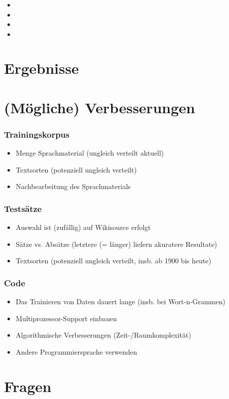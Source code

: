 \documentclass[t]{beamer} %
\begin{document}
% 
\begin{frame}
  \frametitle{}
  \begin{itemize}
  \item \pause
  \vspace*{1ex}
  \item  \pause
  \item \pause
  \item 
  \vspace*{1ex}
  \end{itemize}  
\end{frame}

\section{Ergebnisse}

\section{(Mögliche) Verbesserungen}
% 
\begin{frame}
  \frametitle{Trainingskorpus}
  \begin{itemize}
  \item Menge Sprachmaterial (ungleich verteilt aktuell)\pause
  \item Textsorten (potenziell ungleich verteilt)\pause
  \item Nachbearbeitung des Sprachmaterials\pause
  \end{itemize}  
\end{frame}

\begin{frame}
  \frametitle{Testsätze}
  \begin{itemize}
  \item Auswahl ist (zufällig) auf Wikisource erfolgt\pause
  \vspace*{1ex}
  \item Sätze vs. Absätze (letztere (= länger) liefern akuratere Resultate)\pause
  \item Textsorten (potenziell ungleich verteilt, insb. ab 1900 bis heute)\pause
  \end{itemize}  
\end{frame}


\begin{frame}
  \frametitle{Code}
  \begin{itemize}
  \item Das Trainieren von Daten dauert lange (insb. bei Wort-n-Grammen)\pause
  \vspace*{1ex}
  \item Multiprozessor-Support einbauen\pause
  \item Algorithmische Verbesserungen (Zeit-/Raumkomplexität)\pause
  \item Andere Programmiersprache verwenden\pause
  \vspace*{1ex}
  \end{itemize}  
\end{frame}

\section{Fragen}
\end{document}
